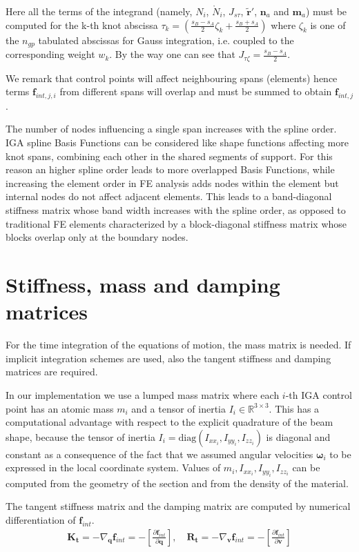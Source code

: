 \documentclass[review]{elsarticle}
\def\avect#1{{\boldsymbol{#1}}}
\def\amatr#1{{\boldsymbol{#1}}}
\begin{document}
Here all the terms of the integrand (namely, $N_i$, $\mathring{N}_i$, $J_{s\tau}$, $\tilde{\avect{r}}'$, $\avect{n}_a$ and $\avect{m}_a$) must be computed for the k-th knot abscissa $\tau_k =  \left(\frac{s_B-s_A}{2} \zeta_k + \frac{s_B+s_A}{2}\right)$ where $\zeta_k$ is one of the $n_{gp}$ tabulated abscissas for Gauss integration, i.e. coupled to the corresponding weight $w_k$. By the way one can see that $J_{\tau\zeta} = \frac{s_B-s_A}{2}$.

We remark that control points will affect neighbouring spans (elements) hence  terms $\avect{f}_{int,j,i}$ from different spans will overlap and must be summed to obtain $\avect{f}_{int,j}$.

The number of nodes influencing a single span increases with the spline order. IGA spline Basis Functions can be considered like shape functions affecting more knot spans, combining each other in the shared segments of support. For this reason an higher spline order leads to more overlapped Basis Functions, while increasing the element order in FE analysis adds nodes within the element but internal nodes do not affect adjacent elements. This leads to a band-diagonal stiffness matrix whose band width increases with the spline order, as opposed to traditional FE elements characterized by a block-diagonal stiffness matrix whose blocks overlap only at the boundary nodes.

\section{Stiffness, mass and damping matrices}

For the time integration of the equations of motion, the mass matrix is needed. If implicit integration schemes are used, also the tangent stiffness and damping matrices are required.

In our implementation we use a lumped mass matrix where each $i$-th IGA control point has an atomic mass $m_i$ and a tensor of inertia $I_i \in \mathbb{R}^{3\times3}$. This has a computational advantage with respect to the explicit quadrature of the beam shape, because the tensor of inertia $I_i=\text{diag}(I_{xx_i},I_{yy_i},I_{zz_i})$ is diagonal and constant as a consequence of the fact that we assumed angular velocities $\avect{\omega}_i$ to be expressed in the local coordinate system. Values of $m_i, I_{xx_i}, I_{yy_i}, I_{zz_i}$ can be computed from the geometry of the section and from the density of the material.

The tangent stiffness matrix and the damping matrix are computed by numerical differentiation of $\avect{f}_{int}$.
%
\begin{align}
\amatr{K_t} 
= -\nabla_{\avect{q}} \avect{f}_{int} 
= - \left[  \frac{\partial\avect{f}_{int}}{\partial\avect{q}} \right], 
\quad
\amatr{R_t} 
= -\nabla_{\avect{v}} \avect{f}_{int} 
= - \left[  \frac{\partial\avect{f}_{int}}{\partial\avect{v}} \right]
	\label{KRmatr}
\end{align}
\end{document}
